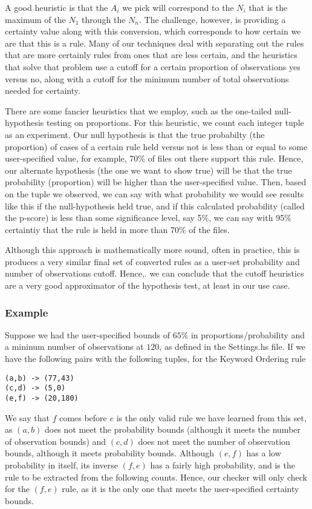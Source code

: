 \documentclass[12pt]{article}
\begin{document}
A good heuristic is that the $A_i$ we pick will correspond to the $N_i$ that is the maximum of the $N_1$ through the $N_n$. The challenge, however, is providing a certainty value along with this conversion, which corresponds to how certain we are that this is a rule. Many of our techniques deal with separating out the rules that are more certainly rules from ones that are less certain, and the heuristics that solve that problem use a cutoff for a certain proportion of observations yes versus no, along with a cutoff for the minimum number of total observations needed for certainty.

There are some fancier heuristics that we employ, such as the one-tailed null-hypothesis testing on proportions. For this heuristic, we count each integer tuple as an experiment. Our null hypothesis is that the true probabilty (the proportion) of cases of a certain rule held versus not is less than or equal to some user-specified value, for example, 70\% of files out there support this rule. Hence, our alternate hypothesis (the one we want to show true) will be that the true probability (proportion) will be higher than the user-specified value. Then, based on the tuple we observed, we can say with what probability we would see results like this if the null-hypothesis held true, and if this calculated probability (called the p-score) is less than some significance level, say 5\%, we can say with 95\% certaintiy that the rule is held in more than 70\% of the files.

Although this approach is mathematically more sound, often in practice, this is produces a very similar final set of converted rules as a user-set probability and number of observations cutoff. Hence,. we can conclude that the cutoff heuristics are a very good approximator of the hypothesis test, at least in our use case.

\subsubsection{Example}
Suppose we had the user-specified bounds of $65\%$ in proportions/probability and a mininum number of observations at $120$, as defined in the Settings.hs file. If we have the following pairs with the following tuples, for the Keyword Ordering rule
\begin{lstlisting}
(a,b) -> (77,43)
(c,d) -> (5,0)
(e,f) -> (20,180)
\end{lstlisting}
We say that $f$ comes before $e$ is the only valid rule we have learned from this set, as $(a,b)$ does not meet the probability bounds (although it meets the number of observation bounds) and $(c,d)$ does not meet the number of observation bounds, although it meets probability bounds. Although $(e,f)$ has a low probability in itself, its inverse $(f,e)$ has a fairly high probability, and is the rule to be extracted from the following counts. Hence, our checker will only check for the $(f,e)$ rule, as it is the only one that meets the user-specified certainty bounds.
\end{document}
